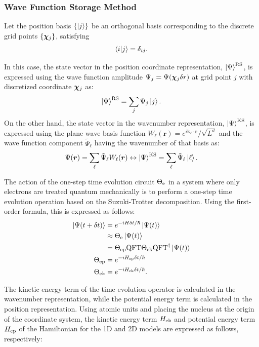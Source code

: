 \documentclass[report_2025.tex]{subfiles}
\begin{document}
\subsubsection{Wave Function Storage Method}
Let the position basis $\{\ket{j}\}$ be an orthogonal basis corresponding to the
discrete grid points $\{\bm{\chi}_{j}\}$, satisfying
\begin{equation}
\braket{i|j}=\delta_{ij}.
\end{equation}

In this case, the state vector in the position coordinate representation,
$\ket{\Psi}^{\mathrm{RS}}$, is expressed using the wave function amplitude
$\Psi_j=\Psi(\bm{\chi}_{j}\delta r)$ at grid point $j$ with discretized coordinate
$\bm{\chi}_{j}$ as:
\begin{equation}
\ket{\Psi}^{\mathrm{RS}} = \sum_{j}\Psi_j\ket{j}.
\end{equation}
On the other hand, the state vector in the wavenumber representation,
$\ket{\Psi}^{\mathrm{KS}}$, is expressed using the plane wave basis function
$W_{\ell}(\bm{r})=e^{i\bm{k}_{\ell}\cdot\bm{r}}/\sqrt{L^d}$ and the wave
function component $\tilde{\Psi}_{\ell}$ having the wavenumber of that basis as:
\begin{equation}
\Psi(\bm{r})=\sum_{\ell} \tilde{\Psi}_{\ell}W_{\ell}(\bm{r})\leftrightarrow
\ket{\Psi}^{\mathrm{KS}} = \sum_{\ell}\tilde{\Psi}_{\ell}\ket{\ell}.
\end{equation}

The action of the one-step time evolution circuit $\Theta_{\mathrm{e}}$ in a system where
only electrons are treated quantum mechanically is to perform a one-step time
evolution operation based on the Suzuki-Trotter decomposition. Using the
first-order formula, this is expressed as follows:
\begin{align}
\ket{\Psi(t+\delta t)}
 &= e^{-iH\delta t/\hbar}\ket{\Psi(t)} \notag \\
 &\approx \Theta_{\mathrm{e}} \ket{\Psi(t)} \label{eq:circuit-eval-theta-e}\\
 &= \Theta_{\mathrm{ep}}\mathrm{QFT}\Theta_{\mathrm{ek}}\mathrm{QFT}^\dagger\ket{\Psi(t)}\\
    \Theta_{\mathrm{ep}}&=e^{-iH_{\mathrm{ep}}\delta t/\hbar}\\
    \Theta_{\mathrm{ek}}&=e^{-iH_{\mathrm{ek}}\delta t/\hbar}.
\end{align}

The kinetic energy term of the time evolution operator is calculated in the
wavenumber representation, while the potential energy term is calculated in the
position representation. Using atomic units and placing the nucleus at the
origin of the coordinate system, the kinetic energy term $H_{\mathrm{ek}}$ and potential
energy term $H_{\mathrm{ep}}$ of the Hamiltonian for the 1D and 2D models are expressed as
follows, respectively:
\end{document}
